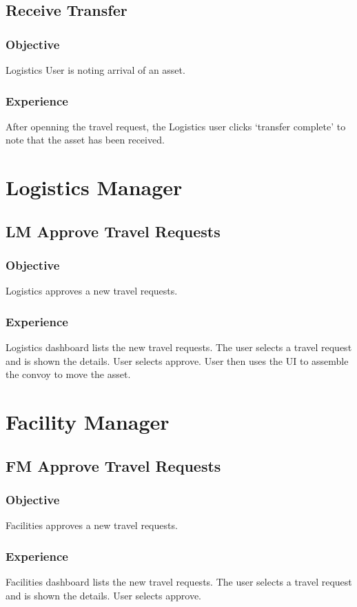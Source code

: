 \subsection*{Receive Transfer}
\subsubsection*{Objective}
Logistics User is noting arrival of an asset.
\subsubsection*{Experience}
After openning the travel request, the Logistics user clicks `transfer complete' to note that the asset has been received.


\section*{Logistics Manager}
\subsection*{LM Approve Travel Requests}
\subsubsection*{Objective}
Logistics approves a new travel requests.
\subsubsection*{Experience}
Logistics dashboard lists the new travel requests. The user selects a travel request and is shown the details. User selects approve. User then uses the UI to assemble the convoy to move the asset.


\section*{Facility Manager}
\subsection*{FM Approve Travel Requests}
\subsubsection*{Objective}
Facilities approves a new travel requests.
\subsubsection*{Experience}
Facilities dashboard lists the new travel requests. The user selects a travel request and is shown the details. User selects approve.



